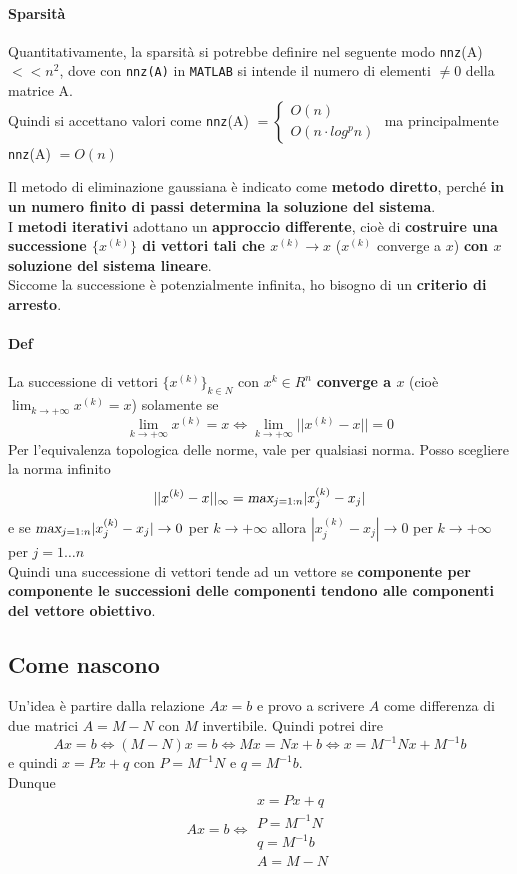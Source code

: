 \documentclass[10pt]{book}
\begin{document}
\paragraph{Sparsità} Quantitativamente, la sparsità si potrebbe definire nel seguente modo \texttt{nnz}(A) $<< n^2$, dove con \texttt{nnz(A)} in \texttt{MATLAB} si intende il numero di elementi $\neq 0$ della matrice A.\\
Quindi si accettano valori come \texttt{nnz}(A) $= \left\{ \begin{array}{l}O(n) \\ O(n\cdot log^p n) \end{array} \right. $ ma principalmente \texttt{nnz}(A) $= O(n)$
\pagebreak

Il metodo di eliminazione gaussiana è indicato come \textbf{metodo diretto}, perché \textbf{in un numero finito di passi determina la soluzione del sistema}.\\
I \textbf{metodi iterativi} adottano un \textbf{approccio differente}, cioè di \textbf{costruire una successione $\{x^{(k)}\}$ di vettori tali che $x^{(k)} \rightarrow x$} ($x^{(k)}$ converge a $x$) \textbf{con $x$ soluzione del sistema lineare}.\\
Siccome la successione è potenzialmente infinita, ho bisogno di un \textbf{criterio di arresto}.
\paragraph{Def} La successione di vettori $\{x^{(k)}\}_{k\in N}$ con $x^{k} \in R^n$ \textbf{converge a $x$} (cioè $\lim_{k\to +\infty} x^{(k)} = x$) solamente se
$$\lim_{k\to +\infty} x^{(k)} = x \Leftrightarrow \lim_{k\to +\infty} ||x^{(k)} - x|| = 0$$
Per l'equivalenza topologica delle norme, vale per qualsiasi norma. Posso scegliere la norma infinito 
$$||x^{(k)} - x||_\infty = \textsl{max}_{j=1:n}|x_j^{(k)} - x_j|$$
e se $\textsl{max}_{j=1:n}|x_j^{(k)} - x_j| \rightarrow 0$ per $k \rightarrow +\infty$ allora $|x_j^{(k)} - x_j| \rightarrow 0$ per $k \rightarrow +\infty$ per $j = 1\ldots n$\\
Quindi una successione di vettori tende ad un vettore se \textbf{componente per componente le successioni delle componenti tendono alle componenti del vettore obiettivo}.
\subsection{Come nascono}
Un'idea è partire dalla relazione $Ax = b$ e provo a scrivere $A$ come differenza di due matrici $A = M - N$ con $M$ invertibile. Quindi potrei dire $$Ax = b \Leftrightarrow (M - N)x = b \Leftrightarrow Mx = Nx + b \Leftrightarrow x = M^{-1}Nx + M^{-1}b$$ e quindi $x = Px + q$ con $P = M^{-1}N$ e $q = M^{-1}b$.\\
Dunque $$Ax = b \Leftrightarrow \begin{array}{l}
x = Px + q \\
P = M^{-1}N\\q = M^{-1}b\\
A = M - N
\end{array}$$
\end{document}
